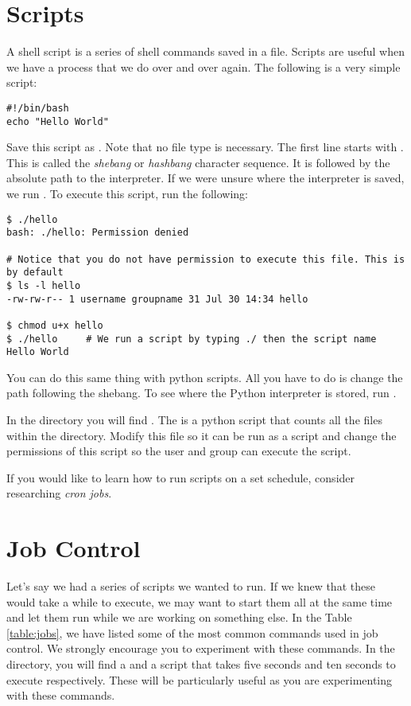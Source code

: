 \section*{Scripts}

A shell script is a series of shell commands saved in a file. Scripts are useful when we have a process that we do over and over again. The following is a very simple script:

\begin{lstlisting}
#!/bin/bash
echo "Hello World"
\end{lstlisting}

Save this script as . Note that no file type is necessary. The first line starts with . This is called the \emph{shebang} or \emph{hashbang} character sequence. It is followed by the absolute path to the  interpreter. If we  were unsure where the  interpreter is saved, we run . To execute this script, run the following:

\begin{lstlisting}
$ ./hello
bash: ./hello: Permission denied

# Notice that you do not have permission to execute this file. This is by default
$ ls -l hello
-rw-rw-r-- 1 username groupname 31 Jul 30 14:34 hello

$ chmod u+x hello
$ ./hello     # We run a script by typing ./ then the script name
Hello World
\end{lstlisting}

You can do this same thing with python scripts. All you have to do is change the path following the shebang. To see where the Python interpreter is stored, run .

\begin{problem}
In the  directory you will find . The  is a python script that counts all the files within the  directory. Modify this file so it can be run as a script and change the permissions of this script so the user and group can execute the script.
\end{problem}

If you would like to learn how to run scripts on a set schedule, consider researching \emph{cron jobs}.

\section*{Job Control}
Let's say we had a series of scripts we wanted to run. If we knew that these would take a while to execute, we may want to start them all at the same time and let them run while we are working on something else. In the Table \ref{table:jobs}, we have listed some of the most common commands used in job control. We strongly encourage you to experiment with these commands. In the  directory, you will find a  and a  script that takes five seconds and ten seconds to execute respectively. These will be particularly useful as you are experimenting with these commands.

